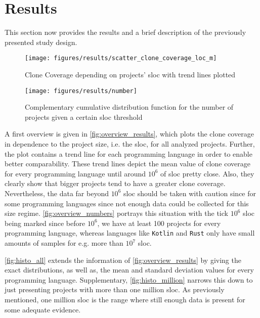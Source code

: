 
\section{Results}
\label{sec:results}

This section now provides the results and a brief description of the previously presented study design. 

\begin{figure}[tbh!]
	\centering
	\texttt{[image: figures/results/scatter\_clone\_coverage\_loc\_m]}
	\caption{Clone Coverage depending on projects' \ac{sloc} with trend lines plotted}
	\label{fig:overview_results}
\end{figure}

\begin{figure}[tbh!]
	\centering
	\texttt{[image: figures/results/number]}
	\caption{Complementary cumulative distribution function for the number of projects given a certain \ac{sloc} threshold}
	\label{fig:overview_numbers}
\end{figure}

A first overview is given in \autoref{fig:overview_results}, which plots the clone coverage in dependence to the project size, i.e. the \acl{sloc}, for all analyzed projects. Further, the plot contains a trend line for each programming language in order to enable better comparability. These trend lines depict the mean value of clone coverage for every programming language until around $10^6$ of \ac{sloc} pretty close. Also, they clearly show that bigger projects tend to have a greater clone coverage.
Nevertheless, the data far beyond $10^6$ \acl{sloc} should be taken with caution since for some programming languages since not enough data could be collected for this size regime. 
\autoref{fig:overview_numbers} portrays this situation with the tick $10^6$ \ac{sloc} being marked since before $10^6$, we have at least 100 projects for every programming language, whereas languages like \texttt{Kotlin} and \texttt{Rust} only have small amounts of samples for e.g. more than $10^7$ \ac{sloc}.


\autoref{fig:histo_all} extends the information of \autoref{fig:overview_results} by giving the exact distributions, as well as, the mean and standard deviation values for every programming language. Supplementary, \autoref{fig:histo_million} narrows this down to just presenting projects with more than one million \acl{sloc}. As previously mentioned, one million \ac{sloc} is the range where still enough data is present for some adequate evidence.

